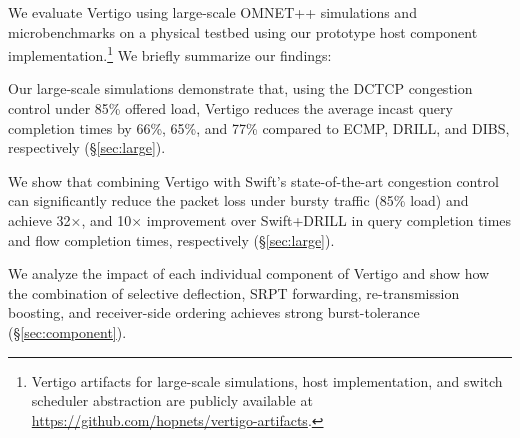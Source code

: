 We evaluate Vertigo using large-scale OMNET++ simulations \cite{omnet} and microbenchmarks on a physical testbed using our prototype host component implementation.\footnote{Vertigo artifacts for large-scale simulations, host implementation, and switch scheduler abstraction are publicly available at \url{https://github.com/hopnets/vertigo-artifacts}.} We briefly summarize our findings:
\begin{compactitem}
    \item Our large-scale simulations demonstrate that, using the DCTCP congestion control under 85\% offered load, Vertigo reduces the average incast query completion times by 66\%, 65\%, and 77\% compared to ECMP, DRILL, and DIBS, respectively (\S\ref{sec:large}).
    \item We show that combining Vertigo with Swift's state-of-the-art congestion control can significantly reduce the packet loss under bursty traffic (85\% load) and achieve 32$\times$, and 10$\times$ improvement over Swift+DRILL in query completion times and flow completion times, respectively  (\S\ref{sec:large}).
    \item We analyze the impact of each individual component of Vertigo and show how the combination of selective deflection, SRPT forwarding, re-transmission boosting, and receiver-side ordering achieves strong burst-tolerance (\S\ref{sec:component}).
\end{compactitem}

